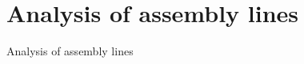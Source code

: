 
\section{Analysis of assembly lines}
  \begin{frame}{Analysis of assembly lines}
    
  \end{frame}
